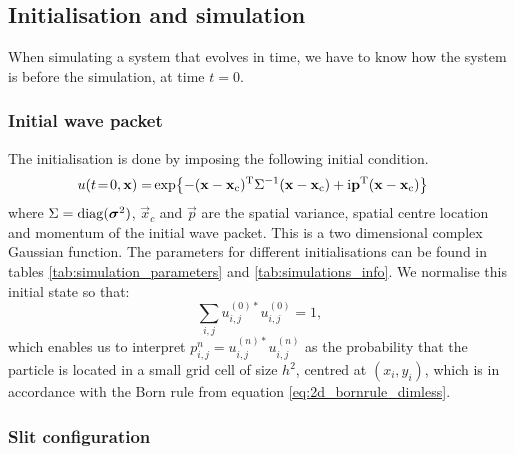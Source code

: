 \subsection{Initialisation and simulation}\label{sec:methods:simulation}
    When simulating a system that evolves in time, we have to know how the system is before the simulation, at time $t=0$.
    
    \subsubsection{Initial wave packet}\label{sec:methods:simulation:initial_wave}
        The initialisation is done by imposing the following initial condition. 
        \begin{equation}\label{eq:p4_initial_condition}
        \begin{split}
            u(t\!=\!0, \mathbf{x}) = & \exp{-(\mathbf{x}-\mathbf{x}_\mathrm{c})^\mathrm{T}\Sigma^{-1}(\mathbf{x}-\mathbf{x}_\mathrm{c}) + \mathrm{i}\mathbf{p}^\mathrm{T}(\mathbf{x}-\mathbf{x}_\mathrm{c})}  
        \end{split}
        \end{equation}
        where $\Sigma = \mathrm{diag}(\boldsymbol{\sigma}^2)$, $\vec{x}_c$ and $\vec{p}$ are the spatial variance, spatial centre location and momentum of the initial wave packet. This is a two dimensional complex Gaussian function. The parameters for different initialisations can be found in tables \ref{tab:simulation_parameters} and \ref{tab:simulations_info}. We normalise this initial state so that:
        \begin{equation}
            \sum_{i,j}u_{i,j}^{(0)*}u_{i,j}^{(0)} = 1, 
        \end{equation}
        which enables us to interpret $p_{i,j}^{n} = u_{i,j}^{(n)*}u_{i,j}^{(n)}$ as the probability that the particle is located in a small grid cell of size $h^2$, centred at $(x_i, y_i)$, which is in accordance with the Born rule from equation \eqref{eq:2d_bornrule_dimless}.
    

    \subsubsection{Slit configuration}\label{sec:methods:simulation:slit_config}

